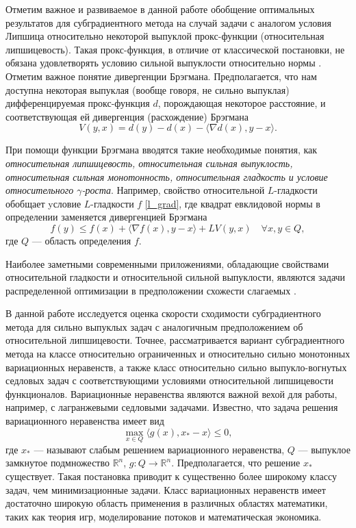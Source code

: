 Отметим важное и развиваемое в данной работе обобщение оптимальных результатов для субградиентного метода на случай задачи с аналогом условия Липшица относительно некоторой выпуклой прокс-функции (относительная липшицевость). Такая прокс-функция, в отличие от классической постановки, не обязана удовлетворять условию сильной выпуклости относительно нормы \cite{AdaMirr_2021,Lu_2018,Zhou_NIPS_2020}. Отметим важное понятие дивергенции Брэгмана. Предполагается, что нам доступна некоторая выпуклая (вообще говоря, не сильно выпуклая) дифференцируемая прокс-функция $d$, порождающая некоторое расстояние, и соответствующая ей дивергенция (расхождение) Брэгмана \cite{Bauschke}
\[
    V(y, x) = d(y) - d(x) - \langle \nabla d(x), y - x \rangle.
\]

При помощи функции Брэгмана вводятся такие необходимые понятия, как \textit{относительная липшицевость, относительная сильная выпуклость, относительная сильная монотонность, относительная гладкость и условие относительного $\gamma$-роста}. Например, свойство относительной $L$-гладкости обобщает yсловие $L$-гладкости $f$ \eqref{l_grad}, где квадрат евклидовой нормы в определении заменяется дивергенцией Брэгмана
$$
    f(y) \leq f(x) + \langle \nabla{f(x)}, y - x \rangle  + L V(y,x) \quad   \forall x, y \in Q,
$$
где $Q$ --- область определения $f$.

Наиболее заметными современными приложениями, обладающие свойствами относительной гладкости и относительной сильной выпуклости, являются задачи распределенной оптимизации в предположении схожести слагаемых \cite{Hendr}. 

В данной работе исследуется оценка скорости сходимости субградиентного метода для сильно выпуклых задач с аналогичным предположением об относительной липшицевости. Точнее, рассматривается вариант субградиентного метода на классе относительно ограниченных и относительно сильно монотонных вариационных неравенств, а также класс относительно сильно выпукло-вогнутых седловых задач с соответствующими условиями относительной липшицевости функционалов. Вариационные неравенства являются важной вехой для работы, например, с лагранжевыми седловыми задачами. Известно, что задача решения вариационного неравенства имеет вид
$$
    \max_{x \in Q} \langle g(x), x_* - x \rangle \leq 0,
$$
где $x_*$ --- называют слабым решением вариационного неравенства, $Q$ --- выпуклое замкнутое подмножество $\mathbb{R}^n$, $g: Q \longrightarrow \mathbb{R}^n$. Предполагается, что решение $x_*$ существует. Такая постановка приводит к существенно более широкому классу задач, чем минимизационные задачи. Класс вариационных неравенств имеет достаточно широкую область применения в различных областях математики, таких как теория игр, моделирование потоков и математическая экономика. 

